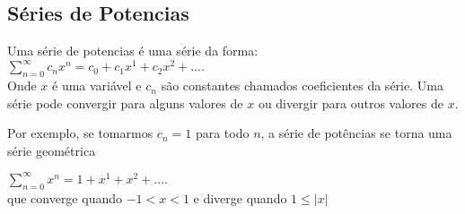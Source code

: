 \newpage
\begin{center}
	\section{Séries de Potencias}
\end{center}
Uma série de potencias é uma série da forma:\\

$\sum_{n=0}^{\infty}c_{n}x^{n}=c_{0}+c_{1}x^{1}+c_{2}x^{2}+....$ \\

Onde $x$ é uma variável e $c_{n}$ são constantes chamados coeficientes da série. Uma série pode convergir para alguns valores de $x$ ou divergir para outros valores de $x$.

Por exemplo, se tomarmos $c_{n}=1$ para todo $n$, a série de potências se torna uma série geométrica

$\sum_{n=0}^{\infty}x^{n}=1+x^{1}+x^{2}+....$ \\
que converge quando $-1<x<1$ e diverge quando $1\leq|x|$


